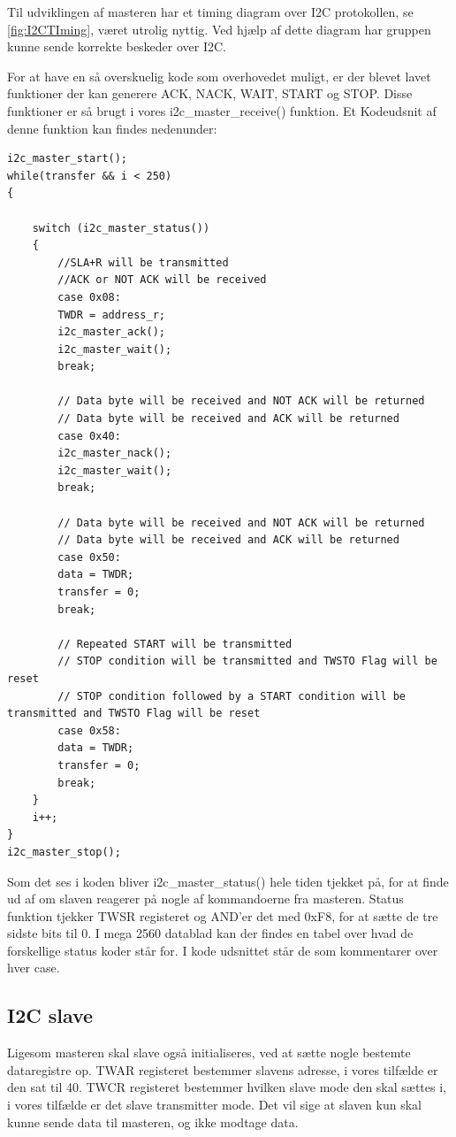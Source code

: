Til udviklingen af masteren har et timing diagram over I2C protokollen, se \autoref{fig:I2CTIming}, været utrolig nyttig. Ved hjælp af dette diagram har gruppen kunne sende korrekte beskeder over I2C. 

For at have en så overskuelig kode som overhovedet muligt, er der blevet lavet funktioner der kan generere ACK, NACK, WAIT, START og STOP. Disse funktioner er så brugt i vores i2c\_master\_receive() funktion. Et Kodeudsnit af denne funktion kan findes nedenunder:

\newpage

\begin{lstlisting}
i2c_master_start();
while(transfer && i < 250)
{
	
	switch (i2c_master_status())
	{
		//SLA+R will be transmitted
		//ACK or NOT ACK will be received
		case 0x08:
		TWDR = address_r;
		i2c_master_ack();
		i2c_master_wait();
		break;
		
		// Data byte will be received and NOT ACK will be returned
		// Data byte will be received and ACK will be returned
		case 0x40:
		i2c_master_nack();
		i2c_master_wait();
		break;
		
		// Data byte will be received and NOT ACK will be returned
		// Data byte will be received and ACK will be returned
		case 0x50:
		data = TWDR;
		transfer = 0;
		break;
		
		// Repeated START will be transmitted
		// STOP condition will be transmitted and TWSTO Flag will be reset
		// STOP condition followed by a START condition will be transmitted and TWSTO Flag will be reset
		case 0x58:
		data = TWDR;
		transfer = 0;
		break;
	}
	i++;
}
i2c_master_stop();
\end{lstlisting}

Som det ses i koden bliver i2c\_master\_status() hele tiden tjekket på, for at finde ud af om slaven reagerer på nogle af kommandoerne fra masteren. Status funktion tjekker TWSR registeret og AND'er det med 0xF8, for at sætte de tre sidste bits til 0. I mega 2560 datablad kan der findes en tabel over hvad de forskellige status koder står for\cite{man:mega2560Kap24}. I kode udsnittet står de som kommentarer over hver case.

\subsection{I2C slave}
Ligesom masteren skal slave også initialiseres, ved at sætte nogle bestemte dataregistre op. TWAR registeret bestemmer slavens adresse, i vores tilfælde er den sat til 40. TWCR registeret bestemmer hvilken slave mode den skal sættes i, i vores tilfælde er det slave transmitter mode. Det vil sige at slaven kun skal kunne sende data til masteren, og ikke modtage data. 


